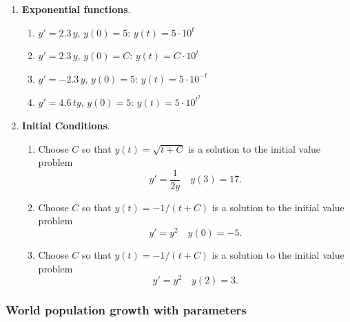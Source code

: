 \begin{enumerate}
\begin{enumerate}
  \item $x'=-y$, $y'=x$, $x(0)=0$, $y(0)=1$: \quad $x(t) = \cos(t+\pi/2)$, $y(t) = \sin(t+\pi/2)$


\end{enumerate}
\item {\bf Exponential functions}.

  \begin{enumerate}
  \item $y'=2.3 \, y$, $y(0)=5$: \quad $y(t)=5 \cdot 10^t$


  \item $y'=2.3 \, y$, $y(0)=C$: \quad $y(t)=C \cdot 10^t$


  \item $y'=-2.3 \, y$, $y(0)=5$: \quad $y(t)=5 \cdot 10^{-t}$


  \item $y'=4.6 \,ty$, $y(0)=5$: \quad $y(t)= 5 \cdot 10^{t^2}$


\end{enumerate}
\item {\bf Initial Conditions}.

  \begin{enumerate}
  \item Choose $C$ so that $y(t) = \sqrt{t+C}$ is a solution to the initial value problem
	\[
y'=\frac{1}{2y} \quad y(3)=17.
\]


  \item Choose $C$ so that $  y(t) = -1/(t+C)$  is a solution to the initial value problem
	\[
y'=y^2 \quad y(0)=-5.
\]


  \item Choose $C$ so that $  y(t) = -1/(t+C)$  is a solution to the initial value problem
	\[
y'=y^2 \quad y(2)=3.
\]

\end{enumerate}
\end{enumerate}
\subsubsection{World population growth with parameters}
\label{subsubsec:world-population-growth-with-parameters}




